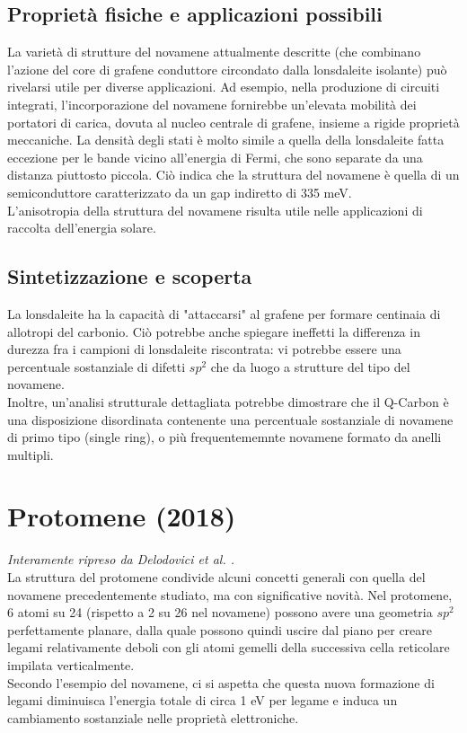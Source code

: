 \documentclass[a4paper,titlepage]{book}
\begin{document}
\section{Proprietà fisiche e applicazioni possibili}
La varietà di strutture del novamene attualmente descritte (che combinano l'azione del core di grafene conduttore circondato dalla lonsdaleite isolante) può rivelarsi utile per diverse applicazioni. Ad esempio, nella produzione di circuiti integrati, l'incorporazione del novamene fornirebbe un'elevata mobilità dei portatori di carica, dovuta al nucleo centrale di grafene, insieme a rigide proprietà meccaniche. 
La densità degli stati è molto simile a quella della lonsdaleite fatta eccezione per le bande vicino all'energia di Fermi, che sono separate da una distanza piuttosto piccola. Ciò indica che la struttura del novamene è quella di un semiconduttore caratterizzato da un gap indiretto di 335 meV. \\
L'anisotropia della struttura del novamene risulta utile nelle applicazioni di raccolta dell'energia solare.

\section{Sintetizzazione e scoperta}
La lonsdaleite ha la capacità di "attaccarsi" al grafene per formare centinaia di allotropi del carbonio. Ciò potrebbe anche spiegare ineffetti la differenza in durezza fra i campioni di lonsdaleite riscontrata: vi potrebbe essere una percentuale sostanziale di difetti $sp^2$ che da luogo a strutture del tipo del novamene.\\
Inoltre, un'analisi strutturale dettagliata potrebbe dimostrare che il Q-Carbon è una disposizione disordinata contenente una percentuale sostanziale di novamene di primo tipo (single ring), o più frequentememnte novamene formato da anelli multipli. 
\chapter{Protomene (2018)}
\textit{Interamente ripreso da Delodovici et al. \cite{PROTO}.}\\

La struttura del protomene condivide alcuni concetti generali con quella del novamene precedentemente studiato, ma con significative novità. Nel protomene, 6 atomi su 24 (rispetto a 2 su 26 nel novamene) possono avere una geometria $sp^2$ perfettamente planare, dalla quale possono quindi uscire dal piano per creare legami relativamente deboli con gli atomi gemelli della successiva cella reticolare impilata verticalmente.\\
Secondo l'esempio del novamene, ci si aspetta che questa nuova formazione di legami diminuisca l'energia totale di circa 1 eV per legame e induca un cambiamento sostanziale nelle proprietà elettroniche.
\end{document}

